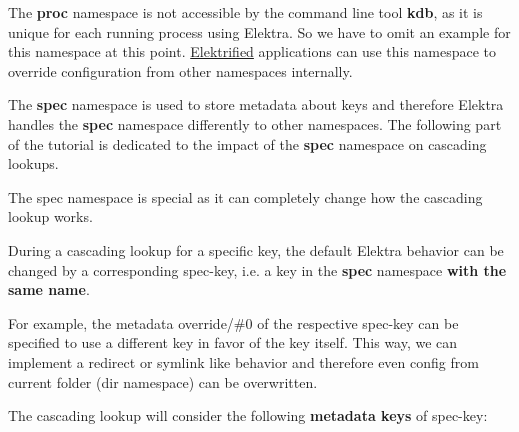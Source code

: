 \begin{DoxyCode}{0}
\DoxyCodeLine{}
\DoxyCodeLine{}
\DoxyCodeLine{}
\end{DoxyCode}


The {\bfseries{proc}} namespace is not accessible by the command line tool {\bfseries{kdb}}, as it is unique for each running process using Elektra. So we have to omit an example for this namespace at this point. \mbox{\hyperlink{doc_help_elektra-glossary_md}{Elektrified}} applications can use this namespace to override configuration from other namespaces internally.

The {\bfseries{spec}} namespace is used to store metadata about keys and therefore Elektra handles the {\bfseries{spec}} namespace differently to other namespaces. The following part of the tutorial is dedicated to the impact of the {\bfseries{spec}} namespace on cascading lookups.

The {\ttfamily spec} namespace is special as it can completely change how the cascading lookup works.

During a cascading lookup for a specific key, the default Elektra behavior can be changed by a corresponding {\ttfamily spec-\/key}, i.\+e. a key in the {\bfseries{spec}} namespace {\bfseries{with the same name}}.

For example, the metadata {\ttfamily override/\#0} of the respective {\ttfamily spec-\/key} can be specified to use a different key in favor of the key itself. This way, we can implement a redirect or symlink like behavior and therefore even config from current folder ({\ttfamily dir} namespace) can be overwritten.

The cascading lookup will consider the following {\bfseries{metadata keys}} of {\ttfamily spec-\/key}\+:


